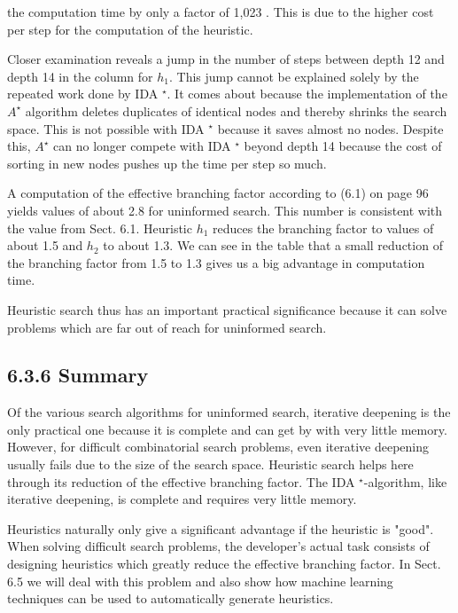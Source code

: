\documentclass[10pt]{article}
\begin{document}
the computation time by only a factor of 1,023 . This is due to the higher cost per step for the computation of the heuristic.

Closer examination reveals a jump in the number of steps between depth 12 and depth 14 in the column for $h_{1}$. This jump cannot be explained solely by the repeated work done by IDA ${ }^{\star}$. It comes about because the implementation of the $A^{\star}$ algorithm deletes duplicates of identical nodes and thereby shrinks the search space. This is not possible with IDA ${ }^{\star}$ because it saves almost no nodes. Despite this, $A^{\star}$ can no longer compete with IDA ${ }^{\star}$ beyond depth 14 because the cost of sorting in new nodes pushes up the time per step so much.

A computation of the effective branching factor according to (6.1) on page 96 yields values of about 2.8 for uninformed search. This number is consistent with the value from Sect. 6.1. Heuristic $h_{1}$ reduces the branching factor to values of about 1.5 and $h_{2}$ to about 1.3. We can see in the table that a small reduction of the branching factor from 1.5 to 1.3 gives us a big advantage in computation time.

Heuristic search thus has an important practical significance because it can solve problems which are far out of reach for uninformed search.

\subsection*{6.3.6 Summary}
Of the various search algorithms for uninformed search, iterative deepening is the only practical one because it is complete and can get by with very little memory. However, for difficult combinatorial search problems, even iterative deepening usually fails due to the size of the search space. Heuristic search helps here through its reduction of the effective branching factor. The IDA ${ }^{\star}$-algorithm, like iterative deepening, is complete and requires very little memory.

Heuristics naturally only give a significant advantage if the heuristic is "good". When solving difficult search problems, the developer's actual task consists of designing heuristics which greatly reduce the effective branching factor. In Sect. 6.5 we will deal with this problem and also show how machine learning techniques can be used to automatically generate heuristics.
\end{document}
